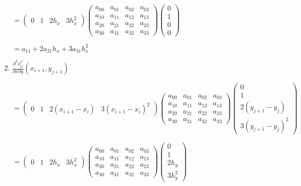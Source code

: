 \documentclass[11pt]{article}
\begin{document}
\begin{enumerate}[label=\textbf{\arabic*)}]
\begin{flushleft}
    $= \begin{pmatrix}
      0 & 1 & 2h_x & 3h_x^2
    \end{pmatrix}
    \begin{pmatrix}
      a_{00}  & a_{01} & a_{02} & a_{03} \\
      a_{10}  & a_{11} & a_{12} & a_{13} \\
      a_{20}  & a_{21} & a_{22} & a_{23} \\
      a_{30}  & a_{31} & a_{32} & a_{33}
    \end{pmatrix}
    \begin{pmatrix}
      0  \\
      1  \\
      0  \\
      0
    \end{pmatrix}$

    $= a_{11} + 2a_{21}h_x + 3a_{31}h_x^2$
    \end{flushleft}

    \item $\frac{\partial^2 s_{ij}^C}{\partial x \partial y}(x_{i + 1}, y_{j + 1})$

    \begin{flushleft}
    $= \begin{pmatrix}
      0 & 1 & 2(x_{i + 1} - x_i) & 3(x_{i + 1} - x_i)^2
    \end{pmatrix}
    \begin{pmatrix}
      a_{00}  & a_{01} & a_{02} & a_{03} \\
      a_{10}  & a_{11} & a_{12} & a_{13} \\
      a_{20}  & a_{21} & a_{22} & a_{23} \\
      a_{30}  & a_{31} & a_{32} & a_{33}
    \end{pmatrix}
    \begin{pmatrix}
      0  \\
      1 \\
      2(y_{j + 1} - y_j)  \\
      3(y_{j + 1} - y_j)^2
    \end{pmatrix}$


    $= \begin{pmatrix}
      0 & 1 & 2h_x & 3h_x^2
    \end{pmatrix}
    \begin{pmatrix}
      a_{00}  & a_{01} & a_{02} & a_{03} \\
      a_{10}  & a_{11} & a_{12} & a_{13} \\
      a_{20}  & a_{21} & a_{22} & a_{23} \\
      a_{30}  & a_{31} & a_{32} & a_{33}
    \end{pmatrix}
    \begin{pmatrix}
      0  \\
      1  \\
      2h_y  \\
      3h_y^2
    \end{pmatrix}$


\end{flushleft}
\end{enumerate}
\end{document}

